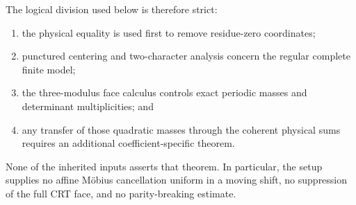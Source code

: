 The logical division used below is therefore strict:
\begin{enumerate}[label=(\roman*)]
 \item the physical equality is used first to remove residue-zero
 coordinates;
 \item punctured centering and two-character analysis concern the
 regular complete finite model;
 \item the three-modulus face calculus controls exact periodic masses and
 determinant multiplicities; and
 \item any transfer of those quadratic masses through the coherent
 physical sums requires an additional coefficient-specific theorem.
\end{enumerate}
None of the inherited inputs asserts that theorem.  In particular, the
setup supplies no affine M\"obius cancellation uniform in a moving shift,
no suppression of the full CRT face, and no parity-breaking estimate.
